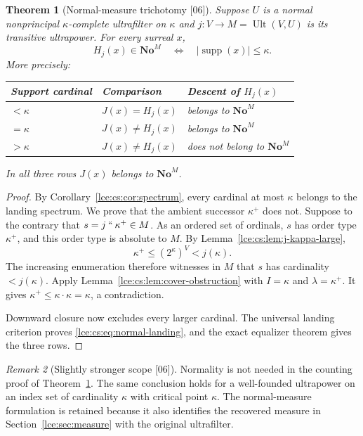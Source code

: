 \documentclass[11pt,letterpaper]{article}
\numberwithin{equation}{section}
\newtheorem{theorem}{Theorem}[section]
\theoremstyle{definition}
\theoremstyle{remark}
\newtheorem{remark}[theorem]{Remark}
\newcommand{\No}{\mathbf{No}}
\newcommand{\supp}{\operatorname{supp}}
\newcommand{\imset}[2]{#1\mathbin{``}#2}
\newcommand{\abs}[1]{\lvert#1\rvert}
\newcommand{\thref}[1]{Theorem~\ref{#1}}
\newcommand{\leref}[1]{Lemma~\ref{#1}}
\newcommand{\src}[1]{\textup{\textsf{\small[#1]}}}%
\newcommand{\Ult}{\operatorname{Ult}}
\begin{document}
\begin{theorem}[Normal-measure trichotomy \src{06}]\label{lce:cs:thm:normal-trichotomy}
Suppose $U$ is a normal nonprincipal $\kappa$-complete ultrafilter on
$\kappa$ and $j:V\to M=\Ult(V,U)$ is its transitive ultrapower. For every
surreal $x$,
\begin{equation}\label{lce:cs:eq:normal-landing}
 H_j(x)\in\No^M\quad\Longleftrightarrow\quad\abs{\supp(x)}\le\kappa.
\end{equation}
More precisely:
\begin{center}
\begin{tabular}{@{}lll@{}}
\toprule
Support cardinal & Comparison & Descent of $H_j(x)$\\
\midrule
$<\kappa$ & $J(x)=H_j(x)$ & belongs to $\No^M$\\
$=\kappa$ & $J(x)\ne H_j(x)$ & belongs to $\No^M$\\
$>\kappa$ & $J(x)\ne H_j(x)$ & does not belong to $\No^M$\\
\bottomrule
\end{tabular}
\end{center}
In all three rows $J(x)$ belongs to $\No^M$.
\end{theorem}
\begin{proof}
By Corollary~\ref{lce:cs:cor:spectrum}, every cardinal at most $\kappa$
belongs to the landing spectrum. We prove that the ambient successor
$\kappa^+$ does not. Suppose to the contrary that $s=\imset j{\kappa^+}\in M$.
As an ordered set of ordinals, $s$ has order type $\kappa^+$, and this order
type is absolute to $M$. By \leref{lce:cs:lem:j-kappa-large},
\[
 \kappa^+\le(2^\kappa)^V<j(\kappa).
\]
The increasing enumeration therefore witnesses in $M$ that $s$ has
cardinality $<j(\kappa)$. Apply \leref{lce:cs:lem:cover-obstruction} with
$I=\kappa$ and $\lambda=\kappa^+$. It gives $\kappa^+\le\kappa\cdot\kappa=\kappa$,
a contradiction.

Downward closure now excludes every larger cardinal. The universal landing
criterion proves \eqref{lce:cs:eq:normal-landing}, and the exact equalizer
theorem gives the three rows.
\end{proof}

\begin{remark}[Slightly stronger scope \src{06}]
Normality is not needed in the counting proof of
\thref{lce:cs:thm:normal-trichotomy}. The same conclusion holds for a
well-founded ultrapower on an index set of cardinality $\kappa$ with
critical point $\kappa$. The normal-measure formulation is retained because
it also identifies the recovered measure in Section~\ref{lce:sec:measure}
with the original ultrafilter.
\end{remark}
\end{document}
